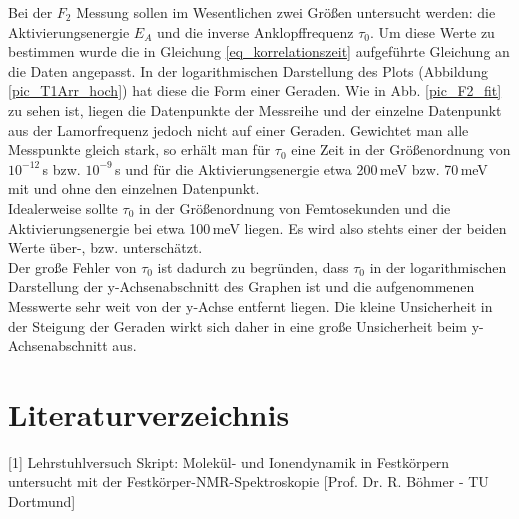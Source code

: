 Bei der $F_2$ Messung sollen im Wesentlichen zwei Größen untersucht werden: die Aktivierungsenergie $E_A$ und die inverse Anklopffrequenz $\tau_0$. Um diese Werte zu bestimmen wurde die in Gleichung \ref{eq_korrelationszeit} aufgeführte Gleichung an die Daten angepasst. In der logarithmischen Darstellung des Plots (Abbildung \ref{pic_T1Arr_hoch}) hat diese die Form einer Geraden. Wie in Abb. \ref{pic_F2_fit} zu sehen ist, liegen die Datenpunkte der Messreihe und der einzelne Datenpunkt aus der Lamorfrequenz jedoch nicht auf einer Geraden. Gewichtet man alle Messpunkte gleich stark, so erhält man für $\tau_0$ eine Zeit in der Größenordnung von $10^{-12}$\,s bzw. $10^{-9}$\,s und für die Aktivierungsenergie etwa 200\,meV bzw. 70\,meV mit und ohne den einzelnen Datenpunkt.\\
Idealerweise sollte $\tau_0$ in der Größenordnung von Femtosekunden und die Aktivierungsenergie bei etwa 100\,meV liegen. Es wird also stehts einer der beiden Werte über-, bzw. unterschätzt.\\
Der große Fehler von $\tau_0$ ist dadurch zu begründen, dass $\tau_0$ in der logarithmischen Darstellung der y-Achsenabschnitt des Graphen ist und die aufgenommenen Messwerte sehr weit von der y-Achse entfernt liegen. Die kleine Unsicherheit in der Steigung der Geraden wirkt sich daher in eine große Unsicherheit beim y-Achsenabschnitt aus.

\section*{Literaturverzeichnis}
[1] Lehrstuhlversuch Skript: Molekül- und Ionendynamik in Festkörpern
untersucht mit der Festkörper-NMR-Spektroskopie
[Prof. Dr. R. Böhmer - TU Dortmund]






